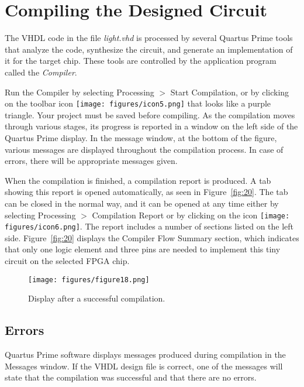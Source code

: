 \section{Compiling the Designed Circuit}


The VHDL code in the file {\it light.vhd} is processed by several 
Quartus Prime tools that analyze the code, synthesize the circuit,
and generate an implementation of it for the target chip. 
These tools are controlled by the application program called the {\it Compiler}.

Run the Compiler by selecting {\sf Processing $>$ Start Compilation}, or by 
clicking on the toolbar icon \texttt{[image: figures/icon5.png]} that looks
like a purple triangle. Your project must be saved before compiling.
As the compilation moves through various stages, its progress is reported
in a window on the left side of the Quartus Prime display.
In the message window, at the bottom of the figure, various messages are displayed
throughout the compilation process.
In case of errors, there will be appropriate messages given.

When the compilation is finished, a compilation report is produced.
A tab showing this report is opened automatically, as seen in Figure~\ref{fig:20}.
The tab can be closed in the normal way, and it can be opened at any time
either by selecting {\sf Processing $>$ Compilation Report} or by clicking on 
the icon \texttt{[image: figures/icon6.png]}.
The report includes a number of sections listed on the left side.
Figure~\ref{fig:20} displays the Compiler Flow Summary section, which
indicates that only one logic element and three pins are needed to implement this 
tiny circuit on the selected FPGA chip.

\begin{figure}[H]
   \begin{center}
      \texttt{[image: figures/figure18.png]}
   \caption{Display after a successful compilation.} 
	 \label{fig:18}
	 \end{center}
\end{figure}

\subsection{Errors}

Quartus Prime software displays messages produced during compilation in the Messages window.
If the VHDL design file is correct, one of the messages will
state that the compilation was successful and that there are no
errors.

